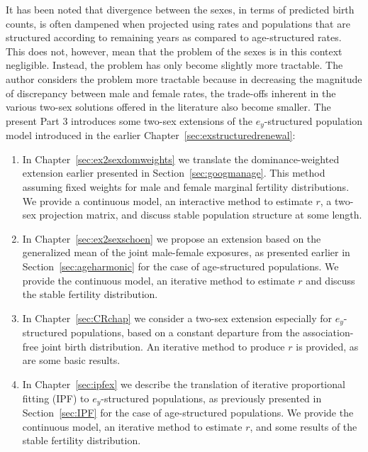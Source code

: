  \FloatBarrier
\label{Chapter:ex2sex}
It has been noted that divergence between the sexes, in terms of predicted birth
counts, is often dampened when projected using rates and populations that are
structured according to remaining years as compared to age-structured rates.
This does not, however, mean that the problem of the sexes is in this context
 negligible. Instead, the problem has
only become slightly more tractable. The author considers the problem more
tractable because in decreasing the magnitude of discrepancy between male and female
rates, the trade-offs inherent in the various two-sex solutions offered in the
literature also become smaller. The present Part 3 introduces some two-sex
extensions of the $e_y$-structured population model introduced in the earlier
Chapter~\ref{sec:exstructuredrenewal}:
\begin{enumerate}
  \item In Chapter~\ref{sec:ex2sexdomweights} we
  translate the dominance-weighted extension earlier presented in
  Section~\ref{sec:googmanage}. This method assuming fixed weights for male and
  female marginal fertility distributions. We provide a continuous model, an
  interactive method to estimate $r$, a two-sex projection matrix, and discuss
  stable population structure at some length.
  \item In Chapter~\ref{sec:ex2sexschoen} we propose an extension based on the
  generalized mean of the joint male-female exposures, as presented earlier in
  Section~\ref{sec:ageharmonic} for the case of age-structured populations. We
  provide the continuous model, an iterative method to estimate $r$ and discuss
  the stable fertility distribution.
  \item In Chapter~\ref{sec:CRchap} we consider a two-sex extension
  especially for $e_y$-structured populations, based on a constant departure
  from the association-free joint birth distribution. An iterative method to
  produce $r$ is provided, as are some basic results.
  \item In Chapter~\ref{sec:ipfex} we describe the translation of iterative
  proportional fitting (IPF) to $e_y$-structured populations, as previously
  presented in Section~\ref{sec:IPF} for the case of age-structured populations.
  We provide the continuous model, an iterative method to estimate $r$, and some
  results of the stable fertility distribution.
\end{enumerate}